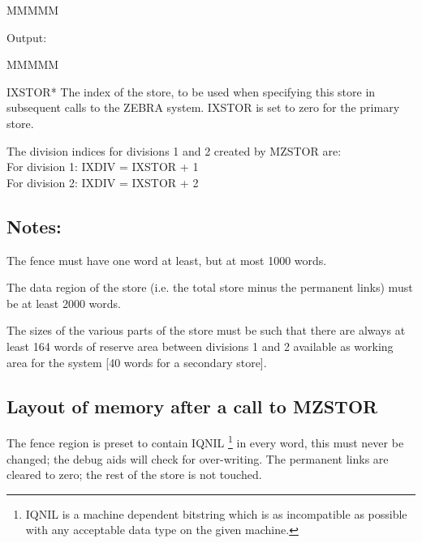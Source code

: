 \begin{DL}{MMMMM}
\item[Output:]
\begin{DL}{MMMMM}
\item[IXSTOR*]The index of the store,
to be used when specifying this store in subsequent calls
to the ZEBRA system. IXSTOR is set to zero for the primary store.
\end{DL}
\end{DL}
\par The division indices for divisions 1 and 2 created by MZSTOR are:\\
For division 1:  IXDIV = IXSTOR + 1\\
For division 2:  IXDIV = IXSTOR + 2
\subsection{Notes:}
\par
\begin{UL}
\item The fence must have one word at least, but at most 1000 words.
\item The data region of the store
(i.e. the total store minus the permanent links)
must be at least 2000 words.
\item The sizes of the various parts of the store must be such
that there are always at least 164 words of reserve area
between divisions 1 and 2 available as working area for the system
[40 words for a secondary store].
\end{UL}
\subsection{Layout of memory after a call to MZSTOR}
\par
\begin{figure}\label{FMZSTOR FRAME=BOX PLACE=INLINE>
\caption{Layout of memory after a call to MZSTOR}
\epsffile{fmFMZSTOR }%
\end{figure}
The fence region is preset to contain IQNIL
\footnote{IQNIL is a machine dependent bitstring which
is as incompatible as possible with any acceptable data type on the
given machine.
}
in every word, this must never be changed;
the debug aids will check for over-writing.
The permanent links are cleared to zero; the rest of the store is not
touched.
